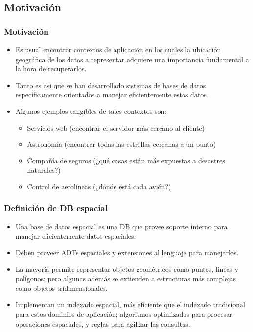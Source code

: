 
\subsection{Motivación}

\begin{frame}
\frametitle{Motivación}
\begin{itemize}
	\item	Es usual encontrar contextos de aplicación en los
		cuales la ubicación geográfica de los datos a representar
		adquiere una importancia fundamental a la hora de
		recuperarlos. \pause \\

	\item	Tanto es asi que se han desarrollado sistemas de
		bases de datos específicamente orientados a manejar
		eficientemente estos datos. \pause \\

	\item	Algunos ejemplos tangibles de tales contextos son: \pause
	\begin{itemize}
		\item	Servicios web (encontrar el servidor más cercano al cliente) \pause
		\item	Astronomía (encontrar todas las estrellas cercanas a un punto) \pause
		\item	Compañía de seguros (¿qué casas están más expuestas a desastres naturales?) \pause
		\item	Control de aerolíneas (¿dónde está cada avión?)
	\end{itemize}
\end{itemize}
\end{frame}

\begin{frame}
\frametitle{Definición de DB espacial}
\begin{itemize}
	\item	Una base de datos espacial es una DB que provee
		soporte interno para manejar eficientemente datos espaciales. \pause

	\item	Deben proveer ADTs espaciales y extensiones al lenguaje para manejarlos. \pause

	\item	La mayoría permite representar objetos geométricos como puntos,
		lineas y polígonos; pero algunas además se extienden a estructuras
		más complejas como objetos tridimensionales. \pause

	\item	Implementan un indexado espacial, más eficiente que el indexado
		tradicional para estos dominios de aplicación; algoritmos optimizados
		para procesar operaciones espaciales, y reglas para agilizar las consultas.
\end{itemize}
\end{frame}

